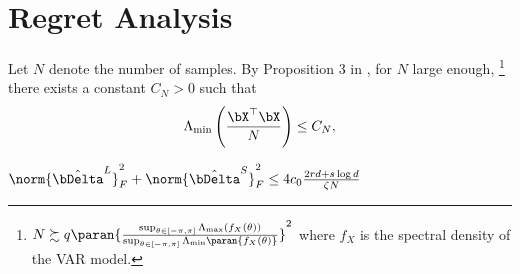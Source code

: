 \section{Regret Analysis} 

Let $N$ denote the number of samples. By Proposition 3 in \citep{basu2019low}, for $N$ large enough, \footnote{$N \succsim q \paran{\frac{\sup_{\theta \in [-\pi, \pi]}\Lambda_{\max}(f_X(\theta))}{\sup_{\theta \in [-\pi, \pi]}\Lambda_{\min}\paran{f_X(\theta)}}}^2$ where $f_X$ is the spectral density of the VAR model.} there exists a constant $C_N>0$ such that 
\begin{equation}
\Lambda_{\min}\left(\frac{{\bX}^{\top}\bX}{N}\right) \leq C_N,
\label{eq:ass-number}
\end{equation}

\begin{theorem}
$\norm{\hat\bDelta^L}_F^2+\norm{\hat\bDelta^{S}}_F^2\leq 4c_0\frac{2rd+s\log d}{\zeta N}$
\label{thm:rl-upperbound}
\end{theorem}

